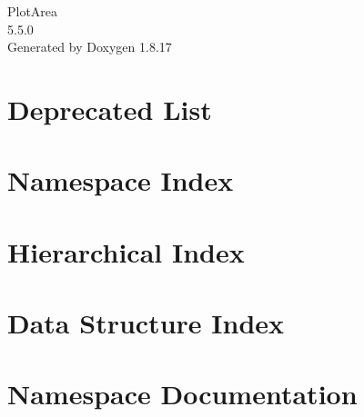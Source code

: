 \let\mypdfximage\pdfximage\def\pdfximage{\immediate\mypdfximage}\documentclass[twoside]{book}
\newcommand{\+}{\discretionary{\mbox{\scriptsize$\hookleftarrow$}}{}{}}
\newcommand{\clearemptydoublepage}{%
  \newpage{\pagestyle{empty}\cleardoublepage}%
}
\begin{document}
\hypersetup{pageanchor=false,
             bookmarksnumbered=true,
             pdfencoding=unicode
            }
\begin{titlepage}
\vspace*{7cm}
\begin{center}%
{\Large Plot\+Area \\[1ex]\large 5.\+5.\+0 }\\
\vspace*{1cm}
{\large Generated by Doxygen 1.8.17}\\
\end{center}
\end{titlepage}
\clearemptydoublepage
{}
\tableofcontents
\clearemptydoublepage
{}
\hypersetup{pageanchor=true}

\chapter{Deprecated List}
\label{deprecated}

\chapter{Namespace Index}

\chapter{Hierarchical Index}

\chapter{Data Structure Index}

\chapter{Namespace Documentation}



\end{document}
